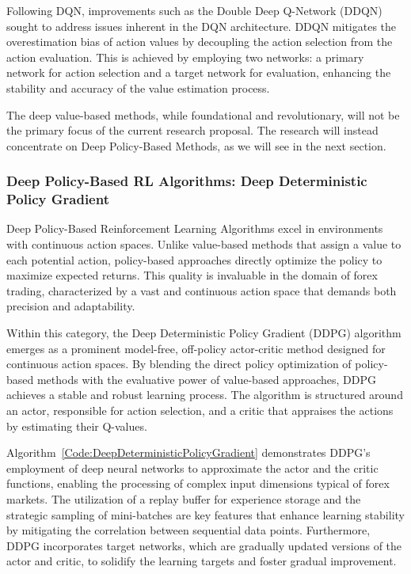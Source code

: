 Following DQN, improvements such as the Double Deep Q-Network (DDQN) sought to address issues inherent in the DQN architecture. DDQN mitigates the overestimation bias of action values by decoupling the action selection from the action evaluation. This is achieved by employing two networks: a primary network for action selection and a target network for evaluation, enhancing the stability and accuracy of the value estimation process.

The deep value-based methods, while foundational and revolutionary, will not be the primary focus of the current research proposal. The research will instead concentrate on Deep Policy-Based Methods, as we will see in the next section.

\subsubsection{Deep Policy-Based RL Algorithms: Deep Deterministic Policy Gradient}

Deep Policy-Based Reinforcement Learning Algorithms excel in environments with continuous action spaces. Unlike value-based methods that assign a value to each potential action, policy-based approaches directly optimize the policy to maximize expected returns. This quality is invaluable in the domain of forex trading, characterized by a vast and continuous action space that demands both precision and adaptability.

Within this category, the Deep Deterministic Policy Gradient (DDPG) algorithm emerges as a prominent model-free, off-policy actor-critic method designed for continuous action spaces. By blending the direct policy optimization of policy-based methods with the evaluative power of value-based approaches, DDPG achieves a stable and robust learning process. The algorithm is structured around an actor, responsible for action selection, and a critic that appraises the actions by estimating their Q-values.



Algorithm~\ref{Code:DeepDeterministicPolicyGradient} demonstrates DDPG's employment of deep neural networks to approximate the actor and the critic functions, enabling the processing of complex input dimensions typical of forex markets. The utilization of a replay buffer for experience storage and the strategic sampling of mini-batches are key features that enhance learning stability by mitigating the correlation between sequential data points. Furthermore, DDPG incorporates target networks, which are gradually updated versions of the actor and critic, to solidify the learning targets and foster gradual improvement.

